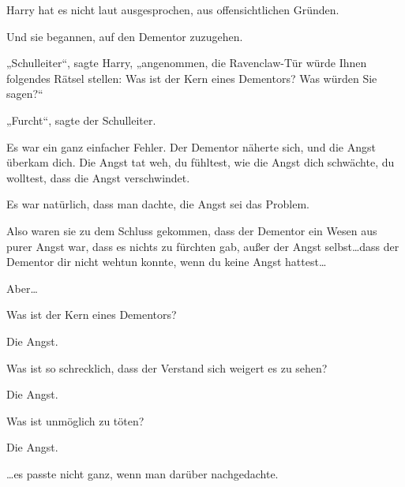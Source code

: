 Harry hat es nicht laut ausgesprochen, aus offensichtlichen Gründen.

Und sie begannen, auf den Dementor zuzugehen.

„Schulleiter“, sagte Harry, „angenommen, die Ravenclaw-Tür würde Ihnen folgendes Rätsel stellen: Was ist der Kern eines Dementors? Was würden Sie sagen?“

„Furcht“, sagte der Schulleiter.

Es war ein ganz einfacher Fehler. Der Dementor näherte sich, und die Angst überkam dich. Die Angst tat weh, du fühltest, wie die Angst dich schwächte, du wolltest, dass die Angst verschwindet.

Es war natürlich, dass man dachte, die Angst sei das Problem.

Also waren sie zu dem Schluss gekommen, dass der Dementor ein Wesen aus purer Angst war, dass es nichts zu fürchten gab, außer der Angst selbst…dass der Dementor dir nicht wehtun konnte, wenn du keine Angst hattest…

Aber…

\begin{em}
Was ist der Kern eines Dementors?

Die Angst.

Was ist so schrecklich, dass der Verstand sich weigert es zu sehen?

Die Angst.

Was ist unmöglich zu töten?

Die Angst.
\end{em}

…es passte nicht ganz, wenn man darüber nachgedachte.


